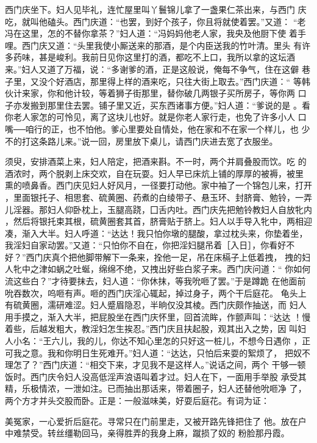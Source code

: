 西门庆坐下。妇人见毕礼，连忙屋里叫丫鬟锦儿拿了一盏果仁茶出来，与西门
庆吃，就叫他磕头。西门庆道：“也罢，到好个孩子，你且将就使着罢。”又道：
“老冯在这里，怎的不替你拿茶？”妇人道：“冯妈妈他老人家，我央及他厨下使
着手哩。西门庆又道：“头里我使小厮送来的那酒，是个内臣送我的竹叶清。里头
有许多药味，甚是峻利。我前日见你这里打的酒，都吃不上口，我所以拿的这坛酒
来。”妇人又道了万福，说：“多谢爹的酒，正是这般说，俺每不争气，住在这僻
巷子里，又没个好酒店，那里得上样的酒来吃，只往大街上取去。”西门庆道：“
等韩伙计来家，你和他计较，等着狮子街那里，替你破几两银子买所房子，等你两
口子亦发搬到那里住去罢。铺子里又近，买东西诸事方便。”妇人道：“爹说的是
。看你老人家怎的可怜见，离了这块儿也好。就是你老人家行走，也免了许多小人
口嘴──咱行的正，也不怕他。爹心里要处自情处，他在家和不在家一个样儿，也
少不的打这条路儿来。”说一回，房里放下桌儿，请西门庆进去宽了衣服坐。

须臾，安排酒菜上来，妇人陪定，把酒来斟。不一时，两个并肩叠股而饮。吃
的酒浓时，两个脱剥上床交欢，自在玩耍。妇人早已床炕上铺的厚厚的被褥，被里
熏的喷鼻香。西门庆见妇人好风月，一径要打动他。家中袖了一个锦包儿来，打开
，里面银托子、相思套、硫黄圈、药煮的白绫带子、悬玉环、封脐膏、勉铃，一弄
儿淫器。那妇人仰卧枕上，玉腿高跷，囗舌内吐。西门庆先把勉铃教妇人自放牝内
，然后将银托束其根，硫黄圈套其首，脐膏贴于脐上。妇人以手导入牝中，两相迎
凑，渐入大半。妇人呼道：“达达！我只怕你墩的腿酸，拿过枕头来，你垫着坐，
我淫妇自家动罢。”又道：“只怕你不自在，你把淫妇腿吊着［入日］，你看好不
好？”西门庆真个把他脚带解下一条来，拴他一足，吊在床槅子上低着拽，
拽的妇人牝中之津如蜗之吐蜒，绵绵不绝，又拽出好些白浆子来。西门庆问道：“
你如何流这些白？”才待要抹去，妇人道：“你休抹，等我吮咂了罢。”于是蹲跪
在他面前吮吞数次，呜咂有声。咂的西门庆淫心辄起，掉过身子，两个干后庭花。
龟头上有硫黄圈，濡研难涩。妇人蹙眉隐忍，半晌仅没其棱。西门庆颇作抽送，而
妇人用手摸之，渐入大半，把屁股坐在西门庆怀里，回首流眸，作颤声叫：“达达
！慢着些，后越发粗大，教淫妇怎生挨忍。”西门庆且扶起股，观其出入之势，因
叫妇人小名：“王六儿，我的儿，你达不知心里怎的只好这一桩儿，不想今日遇你
，正可我之意。我和你明日生死难开。”妇人道：“达达，只怕后来耍的絮烦了，
把奴不理怎了？”西门庆道：“相交下来，才见我不是这样人。”说话之间，两个
干够一顿饭时。西门庆令妇人没高低淫声浪语叫着才过。妇人在下，一面用手举股
承受其精，乐极情浓，一泄如注。已而抽出那话来，带着圈子，妇人还替他吮咂净
了，两个方才并头交股而卧。正是：一般滋味美，好耍后庭花。有词为证：

美冤家，一心爱折后庭花。寻常只在门前里走，又被开路先锋把住了
他。放在户中难禁受。转丝缰勒回马，亲得胜弄的我身上麻，蹴损了奴的
粉脸那丹霞。

